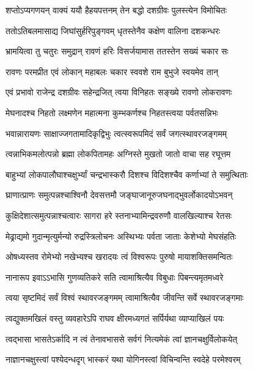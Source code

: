 \twolineshloka
{शप्तोऽप्यगणयन् वाक्यं ययौ हैहयपत्तनम्}
{तेन बद्धो दशग्रीवः पुलस्त्येन विमोचितः} %

\twolineshloka
{ततोऽतिबलमासाद्य जिघांसुर्हरिपुङ्गवम्}
{धृतस्तेनैव कक्षेण वालिना दशकन्धरः} %

\twolineshloka
{भ्रामयित्वा तु चतुरः समुद्रान् रावणं हरिः}
{विसर्जयामास ततस्तेन सख्यं चकार सः} %

\twolineshloka
{रावणः परमप्रीत एवं लोकान् महाबलः}
{चकार स्ववशे राम बुभुजे स्वयमेव तान्} %

\twolineshloka
{एवं प्रभावो राजेन्द्र दशग्रीवः सहेन्द्रजित्}
{त्वया विनिहतः सङ्ख्ये रावणो लोकरावणः} %

\twolineshloka
{मेघनादश्च निहतो लक्ष्मणेन महात्मना}
{कुम्भकर्णश्च निहतस्त्वया पर्वतसन्निभः} %

\twolineshloka
{भवान्नारायणः साक्षाज्जगतामादिकृद्विभुः}
{त्वत्स्वरूपमिदं सर्वं जगत्स्थावरजङ्गमम्} %

\twolineshloka
{त्वन्नाभिकमलोत्पन्नो ब्रह्मा लोकपितामहः}
{अग्निस्ते मुखतो जातो वाचा सह रघूत्तम} %

\twolineshloka
{बाहुभ्यां लोकपालौघाश्चक्षुर्भ्यां चन्द्रभास्करौ}
{दिशश्च विदिशश्चैव कर्णाभ्यां ते समुत्थिताः} %

\twolineshloka
{घ्राणात्प्राणः समुत्पन्नश्चाश्विनौ देवसत्तमौ}
{जङ्घाजानूरुजघनाद्भुवर्लोकादयोऽभवन्} %

\twolineshloka
{कुक्षिदेशात्समुत्पन्नाश्चत्वारः सागरा हरे}
{स्तनाभ्यामिन्द्रवरुणौ वालखिल्याश्च रेतसः} %

\twolineshloka
{मेढ्राद्यमो गुदान्मृत्युर्मन्यो रुद्रस्त्रिलोचनः}
{अस्थिभ्यः पर्वता जाताः केशेभ्यो मेघसंहतिः} %

\twolineshloka
{ओषध्यस्तव रोमेभ्यो नखेभ्यश्च खरादयः}
{त्वं विश्वरूपः पुरुषो मायाशक्तिसमन्वितः} %

\twolineshloka
{नानारूप इवाऽऽभासि गुणव्यतिकरे सति}
{त्वामाश्रित्यैव विबुधाः पिबन्त्यमृतमध्वरे} %

\twolineshloka
{त्वया सृष्टमिदं सर्वं विश्वं स्थावरजङ्गमम्}
{त्वामाश्रित्यैव जीवन्ति सर्वे स्थावरजङ्गमाः} %

\twolineshloka
{त्वद्युक्तमखिलं वस्तु व्यवहारेऽपि राघव}
{क्षीरमध्यगतं सर्पिर्यथा व्याप्याखिलं पयः} %

\twolineshloka
{त्वद्भासा भासतेऽर्कादि न त्वं तेनावभाससे}
{सर्वगं नित्यमेकं त्वां ज्ञानचक्षुर्विलोकयेत्} %

\twolineshloka
{नाज्ञानचक्षुस्त्वां पश्येदन्धदृग् भास्करं यथा}
{योगिनस्त्वां विचिन्वन्ति स्वदेहे परमेश्वरम्} %

